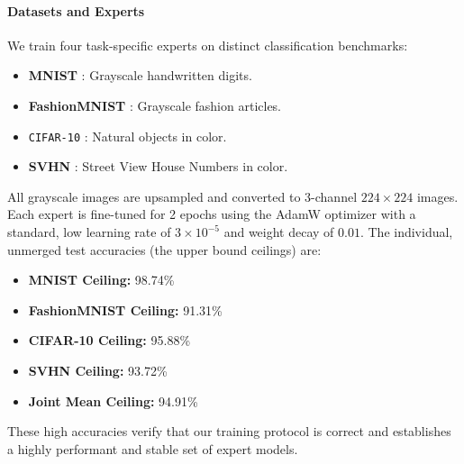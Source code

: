 \paragraph{Datasets and Experts}
We train four task-specific experts on distinct classification benchmarks:
\begin{itemize}
  \item \textbf{MNIST} \cite{lecun1998gradient}: Grayscale handwritten digits.
  \item \textbf{FashionMNIST} \cite{xiao2017fashion}: Grayscale fashion articles.
  \item \texttt{CIFAR-10} \cite{krizhevsky2009learning}: Natural objects in color.
  \item \textbf{SVHN} \cite{netzer2011reading}: Street View House Numbers in color.
\end{itemize}
All grayscale images are upsampled and converted to 3-channel $224 \times 224$ images. Each expert is fine-tuned for 2 epochs using the AdamW optimizer \cite{loshchilov2017decoupled} with a standard, low learning rate of $3\times 10^{-5}$ and weight decay of $0.01$. The individual, unmerged test accuracies (the upper bound ceilings) are:
\begin{itemize}
  \item \textbf{MNIST Ceiling:} 98.74\%
  \item \textbf{FashionMNIST Ceiling:} 91.31\%
  \item \textbf{CIFAR-10 Ceiling:} 95.88\%
  \item \textbf{SVHN Ceiling:} 93.72\%
  \item \textbf{Joint Mean Ceiling:} 94.91\%
\end{itemize}
These high accuracies verify that our training protocol is correct and establishes a highly performant and stable set of expert models.

